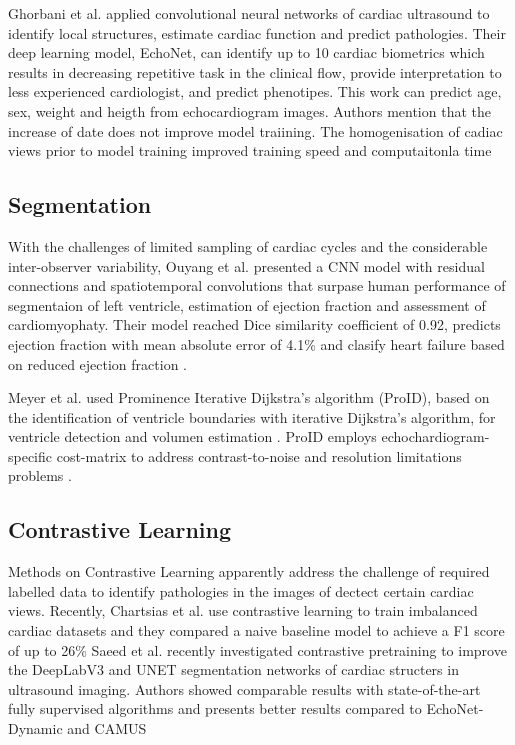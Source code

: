 Ghorbani et al. applied convolutional neural networks of cardiac ultrasound to identify local structures, estimate cardiac function and predict pathologies.
Their deep learning model, EchoNet, can identify up to 10 cardiac biometrics which results in decreasing repetitive task in the clinical flow, provide interpretation to less experienced cardiologist, and predict phenotipes. This work can predict age, sex, weight and heigth from echocardiogram images. 
Authors mention that the increase of date does not improve model traiining. The homogenisation of cadiac views prior to model training improved training speed and computaitonla time \cite{Ghorbani-DigitalMedicineNature-JAN2020}


\subsection{Segmentation}
With the challenges of limited sampling of cardiac cycles and the considerable inter-observer variability, Ouyang et al. presented a CNN model with residual connections and spatiotemporal convolutions that surpase human performance of segmentaion of left ventricle, estimation of ejection fraction and assessment of cardiomyophaty. 
Their model reached Dice similarity coefficient of 0.92, predicts ejection fraction with mean absolute error of 4.1\% and clasify heart failure based on reduced ejection fraction 
\cite{Ouyang-Nature-APR2020}.


Meyer et al. used Prominence Iterative Dijkstra’s algorithm (ProID), based on the identification of ventricle boundaries with iterative Dijkstra's algorithm, for ventricle detection and volumen estimation \cite{Meyers2020}.
ProID employs echochardiogram-specific cost-matrix to address contrast-to-noise and resolution limitations problems \cite{brindise2020unsupervised}.


\subsection{Contrastive Learning}
Methods on Contrastive Learning apparently address the challenge of required labelled data to identify pathologies in the images of dectect certain cardiac views.
Recently, Chartsias et al. use contrastive learning to train imbalanced cardiac datasets and they compared a naive baseline model to achieve a F1 score of up to 26\% \cite{chartsias2021-ASMUS}
Saeed et al. recently investigated contrastive pretraining to improve the DeepLabV3 and UNET segmentation networks of cardiac structers in ultrasound imaging.
Authors showed comparable results with state-of-the-art fully supervised algorithms and presents better results compared to EchoNet-Dynamic and CAMUS \cite{saeed2021MIDL}





